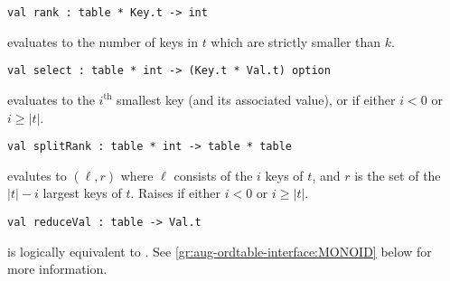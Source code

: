 \begin{cluster}
\label{grp:grm:aug-ordtable-interface::rank}

\begin{gram}[rank]
\label{grm:aug-ordtable-interface::rank}
\begin{verbatim}
val rank : table * Key.t -> int
\end{verbatim}
 evaluates to the number of keys in $t$ which are strictly
smaller than $k$.

\end{gram}
\end{cluster}

\begin{cluster}
\label{grp:grm:aug-ordtable-interface::select}

\begin{gram}[select]
\label{grm:aug-ordtable-interface::select}
\begin{verbatim}
val select : table * int -> (Key.t * Val.t) option
\end{verbatim}
 evaluates to the $i^\text{th}$ smallest key (and its
associated value), or  if either $i < 0$ or $i \geq |t|$.

\end{gram}
\end{cluster}

\begin{cluster}
\label{grp:grm:aug-ordtable-interface::splitrank}

\begin{gram}[splitRank]
\label{grm:aug-ordtable-interface::splitrank}
\begin{verbatim}
val splitRank : table * int -> table * table
\end{verbatim}
 evalutes to $(\ell,r)$ where $\ell$ consists of the $i$
keys of $t$, and $r$ is the set of the $|t|-i$ largest
keys of $t$. Raises  if either $i < 0$ or $i \geq |t|$.

\end{gram}
\end{cluster}

\begin{cluster}
\label{grp:gr:aug-ordtable-interface:reduceVal}

\begin{gram}[reduceVal]
\label{gr:aug-ordtable-interface:reduceVal}
\begin{verbatim}
val reduceVal : table -> Val.t
\end{verbatim}
 is logically equivalent to
. See
\ref{gr:aug-ordtable-interface:MONOID} below for more information.

\end{gram}
\end{cluster}


